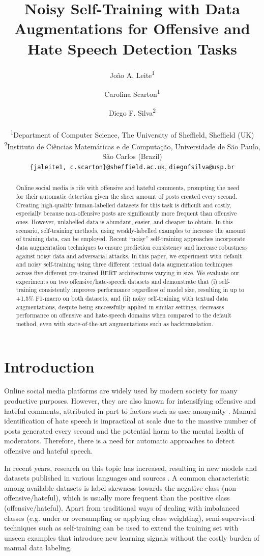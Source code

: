 \documentclass[11pt,a4paper]{article}
\title{Noisy Self-Training with Data Augmentations for Offensive and Hate Speech Detection Tasks}
\author{João A. Leite\textsuperscript{1} \and Carolina Scarton\textsuperscript{1} \and Diego F. Silva\textsuperscript{2} \\ \\
\textsuperscript{1}Department of Computer Science, The University of Sheffield, Sheffield (UK) \\ 
\textsuperscript{2}Instituto de Ciências Matemáticas e de Computação, Universidade de São Paulo, São Carlos (Brazil)\\
\texttt{\{jaleite1, c.scarton\}@sheffield.ac.uk}, \texttt{diegofsilva@usp.br}}
\date{}
\begin{document}
\maketitle
\begin{abstract}
Online social media is rife with offensive and hateful comments, prompting the need for their automatic detection given the sheer amount of posts created every second. Creating high-quality human-labelled datasets for this task is difficult and costly, especially because non-offensive posts are significantly more frequent than offensive ones. However, unlabelled data is abundant, easier, and cheaper to obtain. In this scenario, self-training methods, using weakly-labelled examples to increase the amount of training data, can be employed. Recent ``noisy'' self-training approaches incorporate data augmentation techniques to ensure prediction consistency and increase robustness against noisy data and adversarial attacks. In this paper, we experiment with default and noisy self-training using three different textual data augmentation techniques across five different pre-trained BERT architectures varying in size. We evaluate our experiments on two offensive/hate-speech datasets and demonstrate that (i) self-training consistently improves performance regardless of model size, resulting in up to +1.5\% F1-macro on both datasets, and (ii) noisy self-training with textual data augmentations, despite being successfully applied in similar settings, decreases performance on offensive and hate-speech domains when compared to the default method, even with state-of-the-art augmentations such as backtranslation. 

\end{abstract}


\section{Introduction}
Online social media platforms are widely used by modern society for many productive purposes. However, they are also known for intensifying offensive and hateful comments, attributed in part to factors such as user anonymity \cite{10.1145/3078714.3078723}. Manual identification of hate speech is impractical at scale due to the massive number of posts generated every second and the potential harm to the mental health of moderators. Therefore, there is a need for automatic approaches to detect offensive and hateful speech.

In recent years, research on this topic has increased, resulting in new models and datasets published in various languages and sources \cite{fortunahatespeechsurvey}. A common characteristic among available datasets is label skewness towards the negative class (non-offensive/hateful), which is usually more frequent than the positive class (offensive/hateful).
Apart from traditional ways of dealing with imbalanced classes (e.g. under or oversampling or applying class weighting), semi-supervised techniques such as self-training can be used to extend the training set with unseen examples that introduce new learning signals without the costly burden of manual data labeling.
\end{document}

